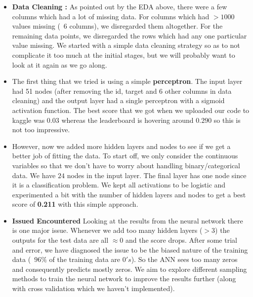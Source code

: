 \begin{itemize}
\item \textbf{Data Cleaning :} As pointed out by the EDA above, there were a few columns which had a lot of missing data. For columns which had $>1000$ values missing (~6 columns), we disregarded them altogether. For the remaining data points, we disregarded the rows which had any one particular value missing. We started with a simple data cleaning strategy so as to not complicate it too much at the initial stages, but we will probably want to look at it again as we go along.

\item The first thing that we tried is using a simple \textbf{perceptron}. The input layer had 51 nodes (after removing the id, target and 6 other columns in data cleaning) and the output layer had a single perceptron with a sigmoid activation function. The best score that we got when we uploaded our code to kaggle was $0.03$ whereas the leaderboard is hovering around $0.290$ so this is not too impressive.

\item However, now we added more hidden layers and nodes to see if we get a better job of fitting the data. To start off, we only consider the continuous variables so that we don't have to worry about handling binary/categorical data. We have $24$ nodes in the input layer. The final layer has one node  since it is a classification problem. We kept all activations to be logistic and experimented a bit with the number of hidden layers and nodes to get a best score of \textbf{0.211} with this simple approach.

\item \textbf{Issued Encountered}  Looking at the results from the neural network there is one major issue. Whenever we add too many hidden layers ($>3$) the outputs for the test data are all $\approx 0$ and the score drops. After some trial and error, we have diagnosed the issue to be the biased nature of the training data (~$96\%$ of the training data are $0's$). So the ANN sees too many zeros and consequently predicts mostly zeros. We aim to explore different sampling methods to train the neural network to improve the results further (along with cross validation which we haven't implemented).
\end{itemize}


